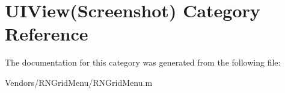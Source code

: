 \hypertarget{category_u_i_view_07_screenshot_08}{}\section{U\+I\+View(Screenshot) Category Reference}
\label{category_u_i_view_07_screenshot_08}


The documentation for this category was generated from the following file\+:\begin{DoxyCompactItemize}
\item 
Vendors/\+R\+N\+Grid\+Menu/R\+N\+Grid\+Menu.\+m\end{DoxyCompactItemize}
